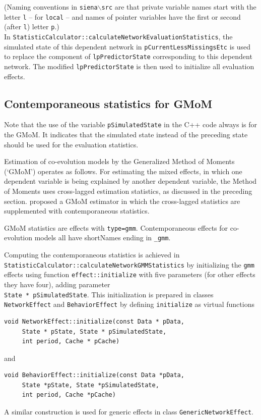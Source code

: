 \documentclass[a4paper,12pt,fleqn]{article}
\begin{document}
\big(Naming conventions in \texttt{siena{$\backslash$}src} are that private variable
names start with the letter \texttt{l} -- for  \texttt{local} --
and names of pointer variables have the first or second (after \texttt{l})
letter \texttt{p}.\big)\\

In \texttt{StatisticCalculator::calculateNetworkEvaluationStatistics},
the simulated state of this dependent network in
\texttt{pCurrentLessMissingsEtc}
is used to replace the component of \texttt{lpPredictorState}
corresponding to this dependent network.
The modified \texttt{lpPredictorState} is then used to initialize
all evaluation effects.

\subsection{Contemporaneous statistics for GMoM}

Note that the use of the variable \texttt{pSimulatedState} in the C++ code
always is for the GMoM. It indicates that the simulated state
instead of the preceding state should be used
for the evaluation statistics.

Estimation of co-evolution models by the Generalized Method of Moments (`GMoM')
operates as follows. For estimating the mixed effects,
in which one dependent variable
is being explained by another dependent variable,
the Method of Moments uses
cross-lagged estimation statistics, as discussed in the
preceding section.
\citet{ASS2019} proposed a GMoM estimator in which the cross-lagged
statistics are supplemented with contemporaneous statistics.

GMoM statistics are effects with \texttt{type=gmm}.
Contemporaneous effects for co-evolution models
all have shortNames ending in \texttt{\_gmm}.

Computing the contemporaneous statistics is achieved in \\
\texttt{StatisticCalculator::calculateNetworkGMMStatistics}
by initializing the \texttt{gmm} effects using function
 \texttt{effect::initialize} with five parameters
 (for other effects they have four), adding
parameter\\
\texttt{State * pSimulatedState}.
This initialization is prepared in classes \texttt{NetworkEffect}
and \texttt{BehaviorEffect} by defining \texttt{initialize} as virtual functions
\begin{verbatim}
void NetworkEffect::initialize(const Data * pData,
     State * pState, State * pSimulatedState,
     int period, Cache * pCache)
\end{verbatim}
and
\begin{verbatim}
void BehaviorEffect::initialize(const Data *pData,
     State *pState, State *pSimulatedState,
     int period, Cache *pCache)
\end{verbatim}
A similar construction is used for generic effects in
class \texttt{GenericNetworkEffect}.
\end{document}
